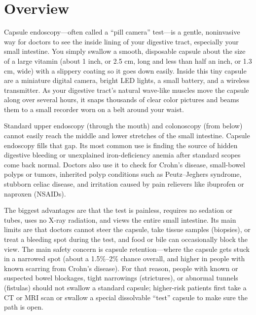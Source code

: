 \label{ch:infographic-capsule-endoscopy}

\section{Overview}

Capsule endoscopy---often called a ``pill camera'' test---is a gentle, noninvasive way for doctors to see the inside lining of your digestive tract, especially your small intestine. You simply swallow a smooth, disposable capsule about the size of a large vitamin (about 1 inch, or 2.5 cm, long and less than half an inch, or 1.3 cm, wide) with a slippery coating so it goes down easily. Inside this tiny capsule are a miniature digital camera, bright LED lights, a small battery, and a wireless transmitter. As your digestive tract's natural wave-like muscles move the capsule along over several hours, it snaps thousands of clear color pictures and beams them to a small recorder worn on a belt around your waist.

Standard upper endoscopy (through the mouth) and colonoscopy (from below) cannot easily reach the middle and lower stretches of the small intestine. Capsule endoscopy fills that gap. Its most common use is finding the source of hidden digestive bleeding or unexplained iron-deficiency anemia after standard scopes come back normal. Doctors also use it to check for Crohn's disease, small-bowel polyps or tumors, inherited polyp conditions such as Peutz--Jeghers syndrome, stubborn celiac disease, and irritation caused by pain relievers like ibuprofen or naproxen (NSAIDs).

The biggest advantages are that the test is painless, requires no sedation or tubes, uses no X-ray radiation, and views the entire small intestine. Its main limits are that doctors cannot steer the capsule, take tissue samples (biopsies), or treat a bleeding spot during the test, and food or bile can occasionally block the view. The main safety concern is capsule retention---where the capsule gets stuck in a narrowed spot (about a 1.5\%--2\% chance overall, and higher in people with known scarring from Crohn's disease). For that reason, people with known or suspected bowel blockages, tight narrowings (strictures), or abnormal tunnels (fistulas) should not swallow a standard capsule; higher-risk patients first take a CT or MRI scan or swallow a special dissolvable ``test'' capsule to make sure the path is open.

